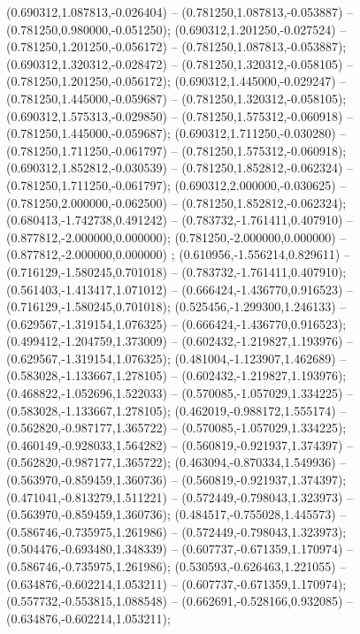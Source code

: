  (0.690312,1.087813,-0.026404) -- (0.781250,1.087813,-0.053887) -- (0.781250,0.980000,-0.051250);
 (0.690312,1.201250,-0.027524) -- (0.781250,1.201250,-0.056172) -- (0.781250,1.087813,-0.053887);
 (0.690312,1.320312,-0.028472) -- (0.781250,1.320312,-0.058105) -- (0.781250,1.201250,-0.056172);
 (0.690312,1.445000,-0.029247) -- (0.781250,1.445000,-0.059687) -- (0.781250,1.320312,-0.058105);
 (0.690312,1.575313,-0.029850) -- (0.781250,1.575312,-0.060918) -- (0.781250,1.445000,-0.059687);
 (0.690312,1.711250,-0.030280) -- (0.781250,1.711250,-0.061797) -- (0.781250,1.575312,-0.060918);
 (0.690312,1.852812,-0.030539) -- (0.781250,1.852812,-0.062324) -- (0.781250,1.711250,-0.061797);
 (0.690312,2.000000,-0.030625) -- (0.781250,2.000000,-0.062500) -- (0.781250,1.852812,-0.062324);
 (0.680413,-1.742738,0.491242) -- (0.783732,-1.761411,0.407910) -- (0.877812,-2.000000,0.000000);
 (0.781250,-2.000000,0.000000) -- (0.877812,-2.000000,0.000000) ;
 (0.610956,-1.556214,0.829611) -- (0.716129,-1.580245,0.701018) -- (0.783732,-1.761411,0.407910);
 (0.561403,-1.413417,1.071012) -- (0.666424,-1.436770,0.916523) -- (0.716129,-1.580245,0.701018);
 (0.525456,-1.299300,1.246133) -- (0.629567,-1.319154,1.076325) -- (0.666424,-1.436770,0.916523);
 (0.499412,-1.204759,1.373009) -- (0.602432,-1.219827,1.193976) -- (0.629567,-1.319154,1.076325);
 (0.481004,-1.123907,1.462689) -- (0.583028,-1.133667,1.278105) -- (0.602432,-1.219827,1.193976);
 (0.468822,-1.052696,1.522033) -- (0.570085,-1.057029,1.334225) -- (0.583028,-1.133667,1.278105);
 (0.462019,-0.988172,1.555174) -- (0.562820,-0.987177,1.365722) -- (0.570085,-1.057029,1.334225);
 (0.460149,-0.928033,1.564282) -- (0.560819,-0.921937,1.374397) -- (0.562820,-0.987177,1.365722);
 (0.463094,-0.870334,1.549936) -- (0.563970,-0.859459,1.360736) -- (0.560819,-0.921937,1.374397);
 (0.471041,-0.813279,1.511221) -- (0.572449,-0.798043,1.323973) -- (0.563970,-0.859459,1.360736);
 (0.484517,-0.755028,1.445573) -- (0.586746,-0.735975,1.261986) -- (0.572449,-0.798043,1.323973);
 (0.504476,-0.693480,1.348339) -- (0.607737,-0.671359,1.170974) -- (0.586746,-0.735975,1.261986);
 (0.530593,-0.626463,1.221055) -- (0.634876,-0.602214,1.053211) -- (0.607737,-0.671359,1.170974);
 (0.557732,-0.553815,1.088548) -- (0.662691,-0.528166,0.932085) -- (0.634876,-0.602214,1.053211);
